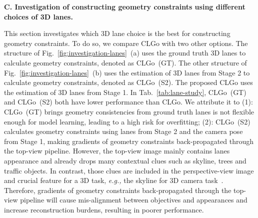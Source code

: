 \documentclass[letterpaper]{article} \usepackage{aaai22}  \usepackage{times}  \usepackage{helvet}  \usepackage{courier}  \usepackage[hyphens]{url}  \usepackage{graphicx} \urlstyle{rm} \def\UrlFont{\rm}  \usepackage{natbib}  \usepackage{caption}
\begin{document}
\noindent \textbf{C. Investigation of constructing geometry constraints using different choices of 3D lanes.}

This section investigates which 3D lane choice is the best for constructing geometry constraints. To do so, we compare CLGo with two other options. The structure of Fig.~\ref{fig:investigation-lanes}~(a) uses the ground truth 3D lanes to calculate geometry constraints, denoted as CLGo~(GT). The other structure of Fig.~\ref{fig:investigation-lanes}~(b) uses the estimation of 3D lanes from Stage 2 to calculate geometry constraints, denoted as CLGo~(S2). The proposed CLGo uses the estimation of 3D lanes from Stage 1.
In Tab.~\ref{tab:lane-study}, CLGo~(GT) and CLGo~(S2) both have lower performance than CLGo. 
We attribute it to (1): CLGo~(GT) brings geometry consistencies from ground truth lanes is not flexible enough for model learning, leading to a high risk for overfitting; (2): CLGo~(S2) calculates geometry constraints using lanes from Stage 2 and the camera pose from Stage 1, making gradients of geometry constraints back-propagated through the top-view pipeline. However, the top-view image mainly contains lanes appearance and already drops many contextual clues such as skyline, trees and traffic objects. In contrast, those clues are included in the perspective-view image and crucial feature for a 3D task, \emph{e.g.,} the skyline for 3D camera task~\cite{MonoEF}. Therefore, gradients of geometry constraints back-propagated through the top-view pipeline will cause mis-alignment between objectives and appearances and increase reconstruction burdens, resulting in poorer performance.



\begin{table}[t]
\begin{center}
\caption{Quantitative results of different two-stage architectures on SVV~(\%). The Error means total lane fitting error given in meters.}
\label{tab:stage-study}
\end{center}
\vspace{-0.05em}
\end{table}
\end{document}
